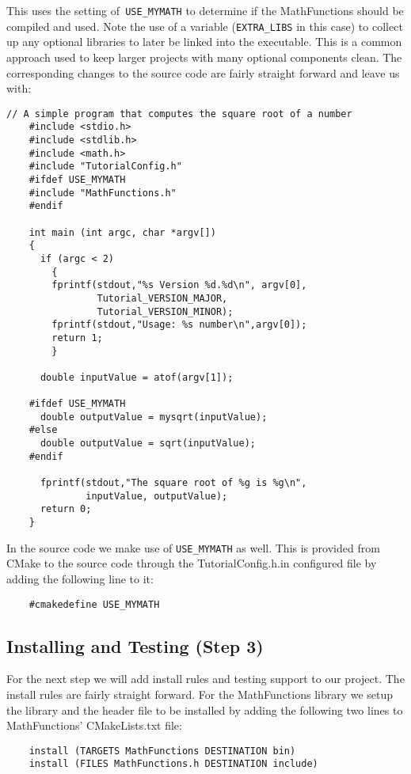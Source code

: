\documentclass[UTF8,a4paper,8pt]{ctexart}
\begin{document}
	This uses the setting of\verb| USE_MYMATH| to determine if the MathFunctions should be compiled and used. Note the use of a variable (\verb|EXTRA_LIBS| in this case) to collect up any optional libraries to later be linked into the executable. This is a common approach used to keep larger projects with many optional components clean. The corresponding changes to the source code are fairly straight forward and leave us with:
	\begin{lstlisting}[frame = lines]
	// A simple program that computes the square root of a number
	#include <stdio.h>
	#include <stdlib.h>
	#include <math.h>
	#include "TutorialConfig.h"
	#ifdef USE_MYMATH
	#include "MathFunctions.h"
	#endif
	 
	int main (int argc, char *argv[])
	{
	  if (argc < 2)
	    {
	    fprintf(stdout,"%s Version %d.%d\n", argv[0],
	            Tutorial_VERSION_MAJOR,
	            Tutorial_VERSION_MINOR);
	    fprintf(stdout,"Usage: %s number\n",argv[0]);
	    return 1;
	    }
	 
	  double inputValue = atof(argv[1]);
	 
	#ifdef USE_MYMATH
	  double outputValue = mysqrt(inputValue);
	#else
	  double outputValue = sqrt(inputValue);
	#endif
	 
	  fprintf(stdout,"The square root of %g is %g\n",
	          inputValue, outputValue);
	  return 0;
	}	
	\end{lstlisting}

	In the source code we make use of \verb|USE_MYMATH| as well. This is provided from CMake to the source code through the TutorialConfig.h.in configured file by adding the following line to it:
	\begin{lstlisting}
	#cmakedefine USE_MYMATH
	\end{lstlisting}
	
	
\subsection{Installing and Testing (Step 3)}
	For the next step we will add install rules and testing support to our project. The install rules are fairly straight forward. For the MathFunctions library we setup the library and the header file to be installed by adding the following two lines to MathFunctions’ CMakeLists.txt file:
	\begin{lstlisting}
	install (TARGETS MathFunctions DESTINATION bin)
	install (FILES MathFunctions.h DESTINATION include)
	\end{lstlisting}
\end{document}

